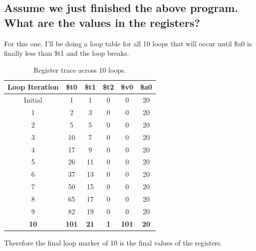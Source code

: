 \documentclass{article}
\begin{document}
\subsection{Assume we just finished the above program. What are the values in the registers?}
For this one, I'll be doing a loop table for all 10 loops that will occur until \$a0 is finally less than \$t1 and the loop breaks.
\begin{table}[h!]
	\centering
	\renewcommand{\arraystretch}{1.5} %
	\begin{tabular}{|c|c|c|c|c|c|}
		\hline
		\textbf{Loop Iteration} & \textbf{\$t0} & \textbf{\$t1} & \textbf{\$t2} & \textbf{\$v0} & \textbf{\$a0} \\
		\hline
		Initial                 & 1             & 1             & 0             & 0             & 20            \\
		\hline
		1                       & 2             & 3             & 0             & 0             & 20            \\
		\hline
		2                       & 5             & 5             & 0             & 0             & 20            \\
		\hline
		3                       & 10            & 7             & 0             & 0             & 20            \\
		\hline
		4                       & 17            & 9             & 0             & 0             & 20            \\
		\hline
		5                       & 26            & 11            & 0             & 0             & 20            \\
		\hline
		6                       & 37            & 13            & 0             & 0             & 20            \\
		\hline
		7                       & 50            & 15            & 0             & 0             & 20            \\
		\hline
		8                       & 65            & 17            & 0             & 0             & 20            \\
		\hline
		9                       & 82            & 19            & 0             & 0             & 20            \\
		\hline
		\textbf{10}             & \textbf{101}  & \textbf{21}   & \textbf{1}    & \textbf{101}  & \textbf{20}   \\
		\hline
	\end{tabular}
	\caption{Register trace across 10 loops.}
\end{table}
\newline
Therefore the final loop marker of 10 is the final values of the registers.
\end{document}
